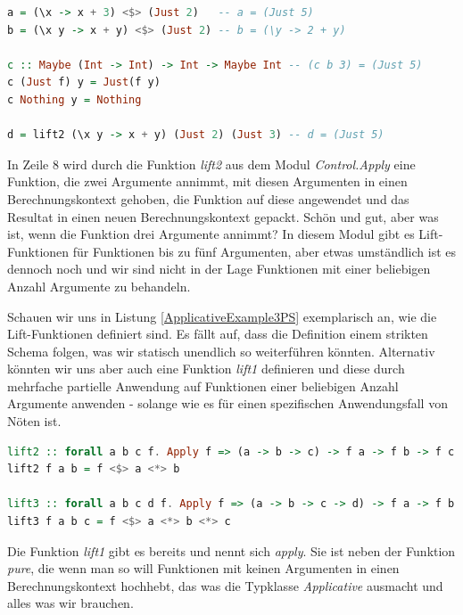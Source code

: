 \documentclass[
12pt,
ngerman,
oneside]
{scrbook} %
\begin{document}
\begin{lstlisting}[language=purescript, style=numbered-and-boxed, caption=Grenzen von Funktoren, label=ApplicativeExample2PS]
a = (\x -> x + 3) <$> (Just 2)   -- a = (Just 5)
b = (\x y -> x + y) <$> (Just 2) -- b = (\y -> 2 + y)

c :: Maybe (Int -> Int) -> Int -> Maybe Int -- (c b 3) = (Just 5)
c (Just f) y = Just(f y)
c Nothing y = Nothing

d = lift2 (\x y -> x + y) (Just 2) (Just 3) -- d = (Just 5)
\end{lstlisting}

In Zeile 8 wird durch die Funktion \emph{lift2} aus dem Modul \emph{Control.Apply} eine Funktion, die zwei Argumente annimmt, mit diesen Argumenten in einen Berechnungskontext gehoben, die Funktion auf diese angewendet und das Resultat in einen neuen Berechnungskontext gepackt. Schön und gut, aber was ist, wenn die Funktion drei Argumente annimmt?  In diesem Modul gibt es Lift-Funktionen für Funktionen bis zu fünf Argumenten, aber etwas umständlich ist es dennoch noch und wir sind nicht in der Lage Funktionen mit einer beliebigen Anzahl Argumente zu behandeln. 

Schauen wir uns in Listung \ref{ApplicativeExample3PS} exemplarisch an, wie die Lift-Funktionen definiert sind. Es fällt auf, dass die Definition einem strikten Schema folgen, was wir statisch unendlich so weiterführen könnten. Alternativ könnten wir uns aber auch eine Funktion \emph{lift1} definieren und diese durch mehrfache partielle Anwendung auf Funktionen einer beliebigen Anzahl Argumente anwenden - solange wie es für einen spezifischen Anwendungsfall von Nöten ist.

\begin{lstlisting}[language=purescript, style=numbered-and-boxed, caption=Auszug aus \emph{Control.Apply}, label=ApplicativeExample3PS]
lift2 :: forall a b c f. Apply f => (a -> b -> c) -> f a -> f b -> f c
lift2 f a b = f <$> a <*> b

lift3 :: forall a b c d f. Apply f => (a -> b -> c -> d) -> f a -> f b -> f c -> f d
lift3 f a b c = f <$> a <*> b <*> c
\end{lstlisting}

Die Funktion \emph{lift1} gibt es bereits und nennt sich \emph{apply}. Sie ist neben der Funktion \emph{pure}, die wenn man so will Funktionen mit keinen Argumenten in einen Berechnungskontext hochhebt, das was die Typklasse \emph{Applicative} ausmacht und alles was wir brauchen. 
\end{document}
